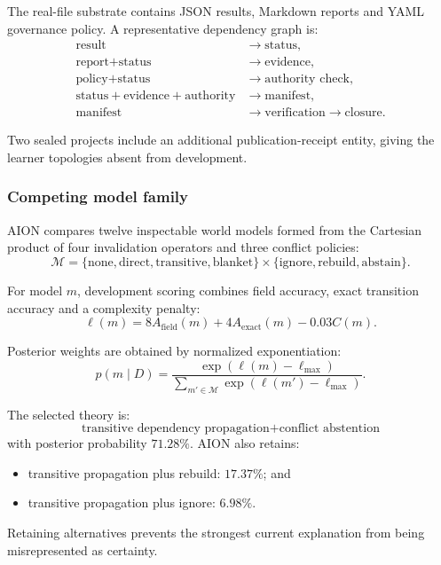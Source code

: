 The real-file substrate contains JSON results, Markdown reports and YAML
governance policy.  A representative dependency graph is:
\[
\begin{aligned}
\text{result}
&\rightarrow \text{status},\\
\text{report}+\text{status}
&\rightarrow \text{evidence},\\
\text{policy}+\text{status}
&\rightarrow \text{authority check},\\
\text{status}+\text{evidence}+\text{authority}
&\rightarrow \text{manifest},\\
\text{manifest}
&\rightarrow \text{verification}
\rightarrow \text{closure}.
\end{aligned}
\]

Two sealed projects include an additional publication-receipt entity, giving
the learner topologies absent from development.

\subsubsection{Competing model family}

AION compares twelve inspectable world models formed from the Cartesian
product of four invalidation operators and three conflict policies:
\[
\mathcal{M}
=
\{
\text{none},\text{direct},\text{transitive},\text{blanket}
\}
\times
\{
\text{ignore},\text{rebuild},\text{abstain}
\}.
\]

For model \(m\), development scoring combines field accuracy, exact transition
accuracy and a complexity penalty:
\[
\ell(m)
=
8A_{\mathrm{field}}(m)
+4A_{\mathrm{exact}}(m)
-0.03C(m).
\]

Posterior weights are obtained by normalized exponentiation:
\[
p(m\mid D)
=
\frac{\exp(\ell(m)-\ell_{\max})}
{\sum_{m'\in\mathcal{M}}\exp(\ell(m')-\ell_{\max})}.
\]

The selected theory is:
\[
\boxed{
\text{transitive dependency propagation}
+\text{conflict abstention}
}
\]
with posterior probability \(71.28\%\).  AION also retains:
\begin{itemize}
    \item transitive propagation plus rebuild: \(17.37\%\); and
    \item transitive propagation plus ignore: \(6.98\%\).
\end{itemize}

Retaining alternatives prevents the strongest current explanation from being
misrepresented as certainty.

